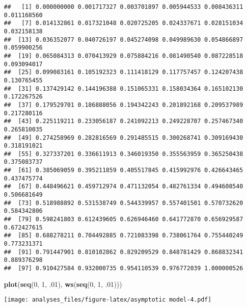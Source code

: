 \documentclass[]{article}
\newenvironment{Shaded}{\begin{snugshade}}{\end{snugshade}}
\newcommand{\KeywordTok}[1]{\textcolor[rgb]{0.13,0.29,0.53}{\textbf{#1}}}
\newcommand{\DecValTok}[1]{\textcolor[rgb]{0.00,0.00,0.81}{#1}}
\newcommand{\NormalTok}[1]{#1}
\begin{document}
\begin{verbatim}
##   [1] 0.000000000 0.001717327 0.003701897 0.005944533 0.008436311 0.011168560
##   [7] 0.014132861 0.017321048 0.020725205 0.024337671 0.028151034 0.032158138
##  [13] 0.036352077 0.040726197 0.045274098 0.049989630 0.054866897 0.059900256
##  [19] 0.065084313 0.070413929 0.075884216 0.081490540 0.087228518 0.093094017
##  [25] 0.099083161 0.105192323 0.111418129 0.117757457 0.124207438 0.130765455
##  [31] 0.137429142 0.144196388 0.151065331 0.158034364 0.165102130 0.172267526
##  [37] 0.179529701 0.186888056 0.194342243 0.201892168 0.209537989 0.217280116
##  [43] 0.225119211 0.233056187 0.241092213 0.249228707 0.257467340 0.265810035
##  [49] 0.274258969 0.282816569 0.291485515 0.300268741 0.309169430 0.318191021
##  [55] 0.327337201 0.336611913 0.346019350 0.355563959 0.365250438 0.375083737
##  [61] 0.385069059 0.395211859 0.405517845 0.415992976 0.426643465 0.437475774
##  [67] 0.448496621 0.459712974 0.471132054 0.482761334 0.494608540 0.506681649
##  [73] 0.518988892 0.531538749 0.544339957 0.557401501 0.570732620 0.584342806
##  [79] 0.598241803 0.612439605 0.626946460 0.641772870 0.656929587 0.672427615
##  [85] 0.688278211 0.704492885 0.721083398 0.738061764 0.755440249 0.773231371
##  [91] 0.791447901 0.810102862 0.829209529 0.848781429 0.868832341 0.889376298
##  [97] 0.910427584 0.932000735 0.954110539 0.976772039 1.000000526
\end{verbatim}

\begin{Shaded}
\begin{Highlighting}[]
\KeywordTok{plot}\NormalTok{(}\KeywordTok{seq}\NormalTok{(}\DecValTok{0}\NormalTok{, }\DecValTok{1}\NormalTok{, .}\DecValTok{01}\NormalTok{), }\KeywordTok{ws}\NormalTok{(}\KeywordTok{seq}\NormalTok{(}\DecValTok{0}\NormalTok{, }\DecValTok{1}\NormalTok{, .}\DecValTok{01}\NormalTok{)))}
\end{Highlighting}
\end{Shaded}

\texttt{[image: analyses\_files/figure-latex/asymptotic model-4.pdf]}
\end{document}

